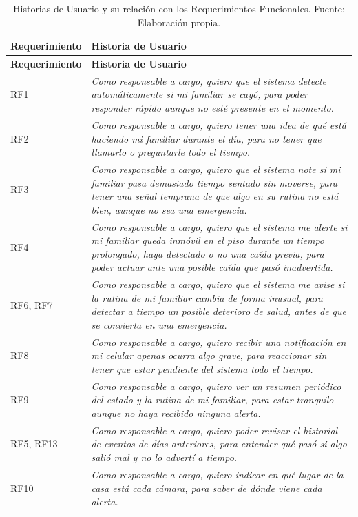 \begin{longtable}{@{}p{}p{}@{}}
\caption[Historias de Usuario y Requerimientos Funcionales.]{Historias de Usuario y su relación con los Requerimientos Funcionales. Fuente: Elaboración propia.}
\label{tab:hu} \\
\toprule
\textbf{Requerimiento} & \textbf{Historia de Usuario} \\
\midrule
\endfirsthead
\toprule
\textbf{Requerimiento} & \textbf{Historia de Usuario} \\
\midrule
\endhead
\bottomrule
\endfoot
RF1 & \textit{Como responsable a cargo, quiero que el sistema detecte automáticamente si mi familiar se cayó, para poder responder rápido aunque no esté presente en el momento.} \\[6pt]
RF2 & \textit{Como responsable a cargo, quiero tener una idea de qué está haciendo mi familiar durante el día, para no tener que llamarlo o preguntarle todo el tiempo.} \\[6pt]
RF3 & \textit{Como responsable a cargo, quiero que el sistema note si mi familiar pasa demasiado tiempo sentado sin moverse, para tener una señal temprana de que algo en su rutina no está bien, aunque no sea una emergencia.} \\[6pt]
RF4 & \textit{Como responsable a cargo, quiero que el sistema me alerte si mi familiar queda inmóvil en el piso durante un tiempo prolongado, haya detectado o no una caída previa, para poder actuar ante una posible caída que pasó inadvertida.} \\[6pt]
RF6, RF7 & \textit{Como responsable a cargo, quiero que el sistema me avise si la rutina de mi familiar cambia de forma inusual, para detectar a tiempo un posible deterioro de salud, antes de que se convierta en una emergencia.} \\[6pt]
RF8 & \textit{Como responsable a cargo, quiero recibir una notificación en mi celular apenas ocurra algo grave, para reaccionar sin tener que estar pendiente del sistema todo el tiempo.} \\[6pt]
RF9 & \textit{Como responsable a cargo, quiero ver un resumen periódico del estado y la rutina de mi familiar, para estar tranquilo aunque no haya recibido ninguna alerta.} \\[6pt]
RF5, RF13 & \textit{Como responsable a cargo, quiero poder revisar el historial de eventos de días anteriores, para entender qué pasó si algo salió mal y no lo advertí a tiempo.} \\[6pt]
RF10 & \textit{Como responsable a cargo, quiero indicar en qué lugar de la casa está cada cámara, para saber de dónde viene cada alerta.} \\[6pt]

\end{longtable}
